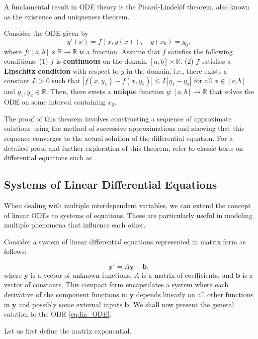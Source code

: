 A fundamental result in ODE theory is the Picard-Lindelöf theorem, also known as the existence and uniqueness theorem.
\begin{theorem}\label{thm:ODE_picard}
Consider the ODE given by
\[
y'(x) = f(x, y(x)), \quad y(x_0) = y_0,
\]
where $f: [a, b] \times \mathbb{R} \rightarrow \mathbb{R}$ is a function. Assume that $f$ satisfies the following conditions: (1) $ f $ is \textbf{continuous} on the domain $ [a, b] \times \mathbb{R} $.
(2) $ f $ satisfies a \textbf{Lipschitz condition} with respect to $ y $ in the domain, i.e., there exists a constant $ L > 0 $ such that
$ 
   |f(x, y_1) - f(x, y_2)| \leq L |y_1 - y_2|
$
   for all $ x \in [a, b] $ and $ y_1, y_2 \in \mathbb{R} $.
Then, there exists a \textbf{unique} function $ y: [a, b] \rightarrow \mathbb{R} $ that solves the ODE on some interval containing $ x_0 $.
\end{theorem}
The proof of this theorem involves constructing a sequence of approximate solutions using the method of successive approximations and showing that this sequence converges to the actual solution of the differential equation.
For a detailed proof and further exploration of this theorem, refer to classic texts on differential equations such as \cite{hirsch2013differential}.

\subsection{Systems of Linear Differential Equations}
When dealing with multiple interdependent variables, we can extend the concept of linear ODEs to systems of equations. These are particularly useful in modeling multiple phenomena that influence each other.

Consider a system of linear differential equations represented in matrix form as follows:

\begin{equation}\label{eq:lin_ODE}    
\mathbf{y}' = A \mathbf{y} + \mathbf{b},
\end{equation}
where $ \mathbf{y} $ is a vector of unknown functions, $ A $ is a matrix of coefficients, and $ \mathbf{b} $ is a vector of constants. This compact form encapsulates a system where each derivative of the component functions in $ \mathbf{y} $ depends linearly on all other functions in $ \mathbf{y} $ and possibly some external inputs $ \mathbf{b} $. We shall now present the general solution to the ODE \eqref{eq:lin_ODE}.

Let us first define the matrix exponential.

